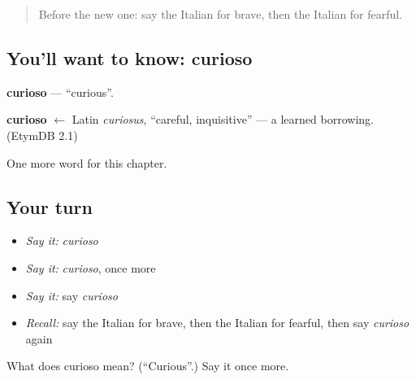 \label{lesson:IT-C189-curioso}



\begin{quote}
Before the new one: say the Italian for brave, then the Italian for fearful.
\end{quote}

\subsection*{You'll want to know: curioso}
\textbf{curioso} — \textquotedblleft{}curious\textquotedblright{}.

\begin{cousinweb}
\textbf{curioso} $\leftarrow$ Latin \emph{curiosus}, \textquotedblleft{}careful, inquisitive\textquotedblright{} — a learned borrowing. (EtymDB 2.1)
\end{cousinweb}

\begin{grammarlens}[title={What you've built}]
One more word for this chapter.
\end{grammarlens}

\subsection*{Your turn}
\begin{itemize}
\raggedright
  \item \emph{Say it:} \emph{curioso}
  \item \emph{Say it:} \emph{curioso}, once more
  \item \emph{Say it:} say \emph{curioso}
  \item \emph{Recall:} say the Italian for brave, then the Italian for fearful, then say \emph{curioso} again
\end{itemize}

\begin{tcolorbox}[breakable,colback=teal!4,colframe=teal!35!black,title={Before you move on}]
What does curioso mean? (\textquotedblleft{}Curious\textquotedblright{}.) Say it once more.
\end{tcolorbox}
